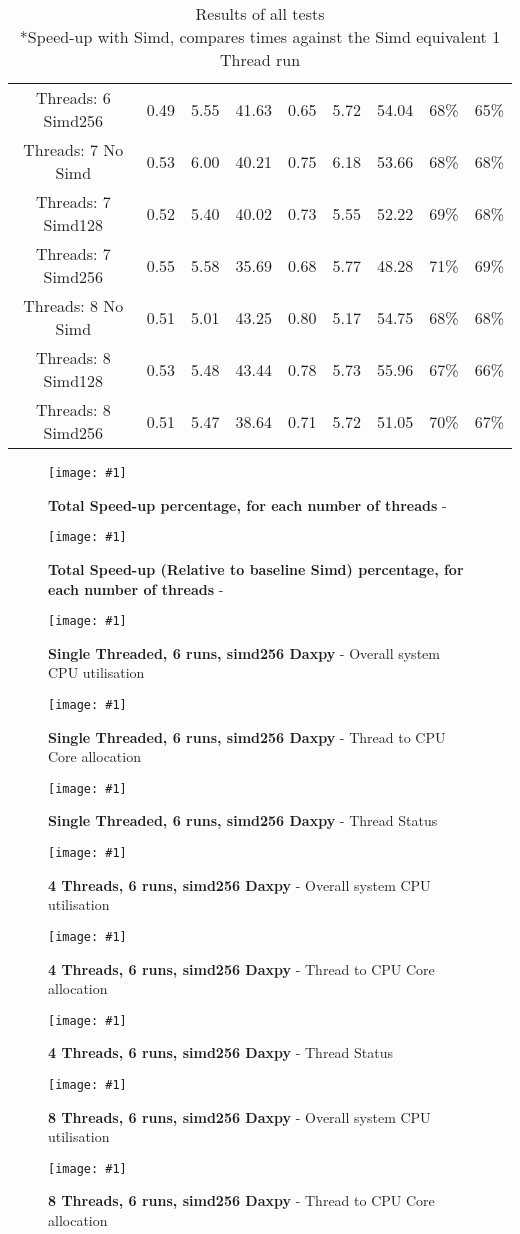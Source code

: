 \documentclass[conference]{acmsiggraph}
\newcommand{\figuremacroF}[4]{
	\begin{figure*}[t] %
		\centering
		\texttt{[image: \#1]}
		\caption[#2]{\textbf{#2} - #3}
		\label{fig:#1}
	\end{figure*}
}
\begin{document}
\begin{table}[b]
{{\begin{minipage}{\textwidth}
\begin{tabular}{ccccccccc}
		Threads: 6 Simd256	&	0.49	&	5.55	&	41.63	&	0.65	&	5.72	&	54.04	&	68\%	&	65\%\\
		Threads: 7 No Simd	&	0.53	&	6.00	&	40.21	&	0.75	&	6.18	&	53.66	&	68\%	&	68\%\\
		Threads: 7 Simd128	&	0.52	&	5.40	&	40.02	&	0.73	&	5.55	&	52.22	&	69\%	&	68\%\\
		Threads: 7 Simd256	&	0.55	&	5.58	&	35.69	&	0.68	&	5.77	&	48.28	&	71\%	&	69\%\\
		Threads: 8 No Simd	&	0.51	&	5.01	&	43.25	&	0.80	&	5.17	&	54.75	&	68\%	&	68\%\\
		Threads: 8 Simd128	&	0.53	&	5.48	&	43.44	&	0.78	&	5.73	&	55.96	&	67\%	&	66\%\\
		Threads: 8 Simd256	&	0.51	&	5.47	&	38.64	&	0.71	&	5.72	&	51.05	&	70\%	&	67\%\\
		\hline
    \end{tabular}
   
    \caption[Table caption text]{Results of all tests\\
    	*Speed-up with Simd, compares times against the	Simd equivalent 1 Thread run}
    \label{table:name}
    \end{minipage} }
}
\end{table}

\figuremacroF
{graph2}
{Total Speed-up percentage, for each number of threads}
{}
{1.0}
\figuremacroF
{graph1}
{Total Speed-up (Relative to baseline Simd) percentage, for each number of threads}
{}
{1.0}
\clearpage

\figuremacroF
{t1i8simd256conc}
{Single Threaded, 6 runs, simd256 Daxpy}
{Overall system CPU utilisation}
{1.0}

\figuremacroF
{t1i8simd256cond}
{Single Threaded, 6 runs, simd256 Daxpy}
{Thread to CPU Core allocation}
{1.0}

\figuremacroF
{t1i8simd256conp}
{Single Threaded, 6 runs, simd256 Daxpy}
{Thread Status}
{1.0}

\figuremacroF
{t4i8simd256conc}
{4 Threads, 6 runs, simd256 Daxpy}
{Overall system CPU utilisation}
{1.0}

\figuremacroF
{t4i8simd256cond}
{4 Threads, 6 runs, simd256 Daxpy}
{Thread to CPU Core allocation}
{1.0}

\figuremacroF
{t4i8simd256conp}
{4 Threads, 6 runs, simd256 Daxpy}
{Thread Status}
{1.0}

\figuremacroF
{t8i8simd256conc}
{8 Threads, 6 runs, simd256 Daxpy}
{Overall system CPU utilisation}
{1.0}

\figuremacroF
{t8i8simd256cond}
{8 Threads, 6 runs, simd256 Daxpy}
{Thread to CPU Core allocation}
{1.0}
\end{document}
